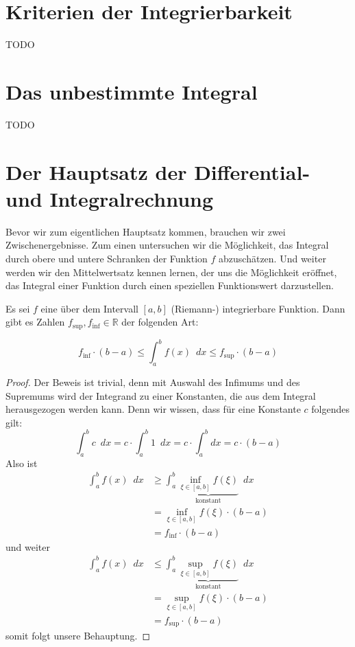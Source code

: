 \section{Kriterien der Integrierbarkeit}
TODO 

\section{Das unbestimmte Integral}
TODO

\section{Der Hauptsatz der Differential- und Integralrechnung}

Bevor wir zum eigentlichen Hauptsatz kommen, brauchen wir zwei Zwischenergebnisse. Zum einen untersuchen wir die Möglichkeit, das Integral durch obere und untere Schranken der Funktion $f$ abzuschätzen. Und weiter werden wir den Mittelwertsatz kennen lernen, der uns die Möglichkeit eröffnet, das Integral einer Funktion durch einen speziellen Funktionswert darzustellen. 

\begin{satz}\label{satz:mittel}
Es sei $f$ eine über dem Intervall $[a,b]$ (Riemann-) integrierbare Funktion. Dann gibt es Zahlen $f_{\sup}, f_{\inf} \in \mathbb{R}$ der folgenden Art:

\begin{equation}
f_{\inf}\cdot (b-a) \le \int_{a}^{b} f(x) \enspace dx \le f_{\sup} \cdot (b-a)
\end{equation}
\end{satz}
\begin{proof}
Der Beweis ist trivial, denn mit Auswahl des Infimums und des Supremums wird der Integrand zu einer Konstanten, die aus dem Integral herausgezogen werden kann. Denn wir wissen, dass für eine Konstante $c$ folgendes gilt:
\begin{equation}
\int_a^b c \enspace dx = c\cdot \int_a^b 1 \enspace dx = c\cdot \int_a^b dx = c\cdot(b-a)
\end{equation}
Also ist
\begin{equation}
\begin{split}
\int_a^b f(x)\enspace dx &\ge \int_a^b \underbrace{\inf_{\xi \in [a,b] } f(\xi)}_{\text{konstant}} \enspace dx \\
 &= \inf_{\xi \in [a,b] } f(\xi) \cdot (b-a) \\
 &= f_{\inf}\cdot (b-a)
\end{split}
\end{equation}
und weiter
\begin{equation}
\begin{split}
\int_a^b f(x)\enspace dx &\le \int_a^b \underbrace{\sup_{\xi \in [a,b] } f(\xi)}_{\text{konstant}} \enspace dx \\
 &= \sup_{\xi \in [a,b] } f(\xi) \cdot (b-a) \\
 &= f_{\sup}\cdot (b-a)
\end{split}
\end{equation}
somit folgt unsere Behauptung.
\end{proof}



